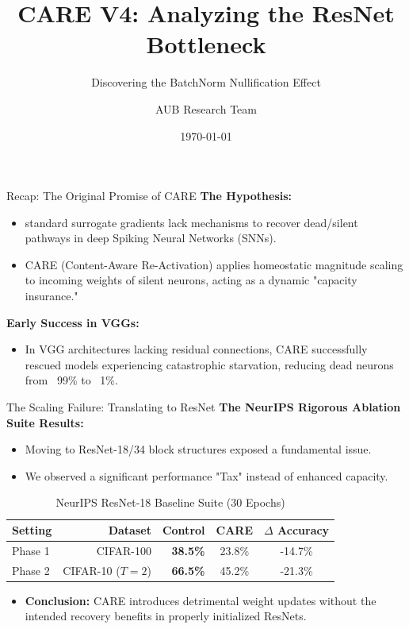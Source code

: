 \documentclass[aspectratio=169]{beamer}
\title{CARE V4: Analyzing the ResNet Bottleneck}
\subtitle{Discovering the BatchNorm Nullification Effect}
\author{AUB Research Team}
\date{\today}
\begin{document}
\begin{frame}
    \titlepage
\end{frame}

\begin{frame}{Recap: The Original Promise of CARE}
    \textbf{The Hypothesis:}
    \begin{itemize}
        \item standard surrogate gradients lack mechanisms to recover dead/silent pathways in deep Spiking Neural Networks (SNNs).
        \item CARE (Content-Aware Re-Activation) applies homeostatic magnitude scaling to incoming weights of silent neurons, acting as a dynamic "capacity insurance."
    \end{itemize}
    
    \vspace{0.3cm}
    \textbf{Early Success in VGGs:}
    \begin{itemize}
        \item In VGG architectures lacking residual connections, CARE successfully rescued models experiencing catastrophic starvation, reducing dead neurons from ~99\% to ~1\%.
    \end{itemize}
\end{frame}

\begin{frame}{The Scaling Failure: Translating to ResNet}
    \textbf{The NeurIPS Rigorous Ablation Suite Results:}
    \begin{itemize}
        \item Moving to ResNet-18/34 block structures exposed a fundamental issue.
        \item We observed a significant performance "Tax" instead of enhanced capacity.
    \end{itemize}
    
    \vspace{0.3cm}
    \begin{table}[]
        \centering
        \begin{tabular}{lrrcc}
            \toprule
            Setting & Dataset & Control & CARE & $\Delta$ Accuracy \\
            \midrule
            Phase 1 & CIFAR-100 & \textbf{38.5\%} & 23.8\% & -14.7\% \\
            Phase 2 & CIFAR-10 ($T=2$) & \textbf{66.5\%} & 45.2\% & -21.3\% \\
            \bottomrule
        \end{tabular}
        \caption{NeurIPS ResNet-18 Baseline Suite (30 Epochs)}
    \end{table}

    \begin{itemize}
        \item \textbf{Conclusion:} CARE introduces detrimental weight updates without the intended recovery benefits in properly initialized ResNets.
    \end{itemize}
\end{frame}
\end{document}
